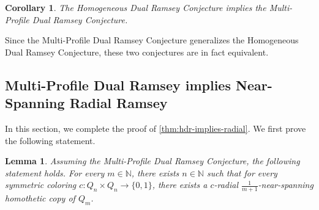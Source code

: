 \documentclass[11pt]{article}
\newcommand{\N}{\mathbb N}
\newtheorem{lemma}[theorem]{Lemma}
\newtheorem{corollary}[theorem]{Corollary}
\theoremstyle{remark}
\begin{document}
\begin{corollary}\label{cor:hdr-implies-mpdr}
    The Homogeneous Dual Ramsey Conjecture implies the Multi-Profile Dual Ramsey Conjecture.
\end{corollary}

Since the Multi-Profile Dual Ramsey Conjecture generalizes the Homogeneous Dual Ramsey Conjecture, these two conjectures are in fact equivalent.

\subsection{Multi-Profile Dual Ramsey implies Near-Spanning Radial Ramsey}

In this section, we complete the proof of \cref{thm:hdr-implies-radial}.
We first prove the following statement.

\begin{lemma}\label{lem:mpdr-implies-somewhat-canonical}
Assuming the Multi-Profile Dual Ramsey Conjecture, the following statement holds.
For every $m\in\N$, there exists $n\in\N$ such that for every symmetric coloring $c : Q_n \times Q_n \to \{0, 1\}$, there exists a $c$-radial $\frac{1}{m+1}$-near-spanning homothetic copy of $Q_m$.
\end{lemma}
\end{document}
